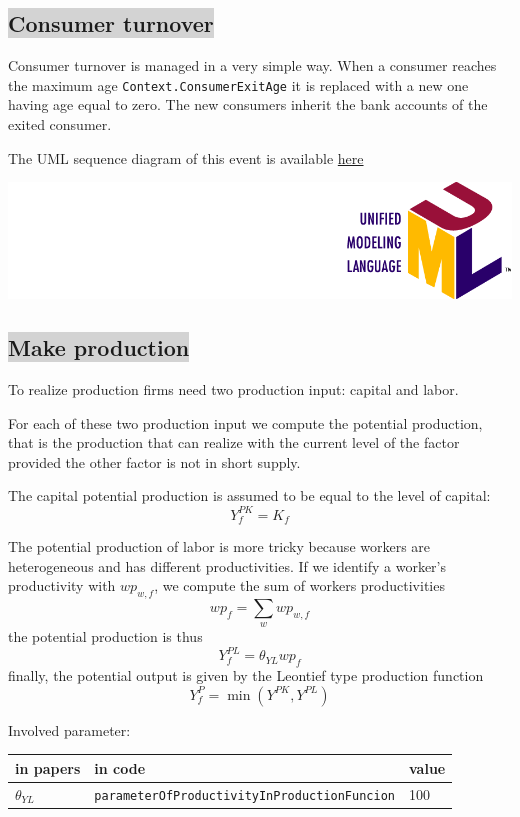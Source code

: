 \documentclass{book}
\newcommand{\umllocation}{file:///Users/giulioni/Dropbox/svn/sfcabm_my/documentation}
\begin{document}
\subsection*{\colorbox{lightgray}{Consumer turnover}}

Consumer turnover is managed in a very simple way. When a consumer reaches the maximum age \verb+Context.ConsumerExitAge+ it is replaced with a new one having age equal to zero. The new consumers inherit the bank accounts of the exited consumer.

\vskip3mm
The UML sequence diagram of this event is available \href{\umllocation/performConsumersTurnover.html}{here}
\begin{marginfigure}
	\includegraphics[scale=0.1]{uml.png}
\end{marginfigure}
\vskip3mm




\subsection*{\colorbox{lightgray}{Make production}}
To realize production firms need two production input: capital and labor.

For each of these two production input we compute the potential production, that is the production that can realize with the current level of the factor provided the other factor is not in short supply.

The capital potential production is assumed to be equal to the level of capital:
\[
	Y^{PK}_f=K_f
\]

The potential production of labor is more tricky because workers are heterogeneous and has different productivities.
If we identify a worker's productivity with $wp_{w,f}$, we compute the sum of workers productivities
\[
	wp_f=\sum_{w}wp_{w,f}
\]
the potential production is thus
\[
	Y^{PL}_f=\theta_{YL}wp_f
\]
finally, the potential output is given by the Leontief type production function
\[
Y^P_f=\min(Y^{PK},Y^{PL})
\]

Involved parameter:

\begin{tabular}{l l l}
	\hline
	in papers& in code&value\\
	\hline
	\hline
$\theta_{YL}$&\verb+parameterOfProductivityInProductionFuncion+&100\\
	\hline
\end{tabular}
\end{document}
